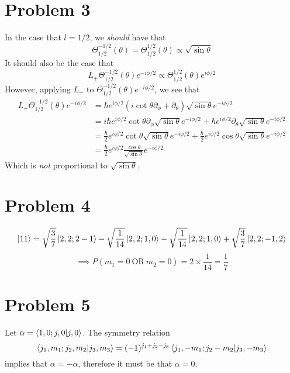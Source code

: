 \documentclass[12pt]{article}
\begin{document}
\section*{Problem 3}
In the case that $l = 1/2$, we \textit{should} have that
\[ \Theta_{1/2}^{-1/2}(\theta) = \Theta_{1/2}^{1/2}(\theta) \propto \sqrt{\sin\theta} \]
It should also be the case that
\[ L_+\Theta_{1/2}^{-1/2}(\theta)e^{-i\phi/2} \propto \Theta_{1/2}^{1/2}(\theta)e^{i\phi/2} \]
However, applying $L_+$ to $\Theta_{1/2}^{-1/2}(\theta)e^{-i\phi/2}$, we see that
\begin{align*}
    L_+\Theta_{1/2}^{-1/2}(\theta)e^{-i\phi/2} & = \hbar e^{i\phi/2}\left(i\cot\theta\partial_\phi + \partial_\theta\right)\sqrt{\sin\theta}e^{-i\phi/2} \\
    & = i\hbar e^{i\phi/2}\cot\theta\partial_\phi\sqrt{\sin\theta}e^{-i\phi/2} + \hbar e^{i\phi/2}\partial_\theta\sqrt{\sin\theta}e^{-i\phi/2} \\
    & = \frac{\hbar}{2}e^{i\phi/2}\cot\theta\sqrt{\sin\theta}e^{-i\phi/2} + \frac{\hbar}{2}e^{i\phi/2}\cos\theta\sqrt{\sin\theta}e^{-i\phi/2} \\
    & = \frac{\hbar}{2}e^{i\phi/2}\frac{\cos\theta}{\sqrt{\sin\theta}}e^{-i\phi/2}
\end{align*}
Which is \textit{not} proportional to $\sqrt{\sin\theta}$.

\section*{Problem 4}
\[ \ket{1 1} = \sqrt{\frac{3}{7}}\ket{2, 2; 2 -1} - \sqrt{\frac{1}{14}}\ket{2,2;1,0} - \sqrt{\frac{1}{14}}\ket{2,2;1,0} + \sqrt{\frac{3}{7}}\ket{2,2;-1,2} \]
\[  \implies P(m_1=0 \:\text{OR}\: m_2=0) = 2\times\frac{1}{14} = \frac{1}{7} \]


\section*{Problem 5}
Let $\alpha = \braket{1,0;j,0}{j,0}$. The symmetry relation
\[ \braket{j_1, m_1; j_2, m_2}{j_3, m_3} = (-1)^{j_1 + j_2 - j_3}\braket{j_1, -m_1; j_2 -m_2}{j_3, -m_3} \]
implies that $\alpha = -\alpha$, therefore it must be that $\alpha = 0$.
\end{document}
